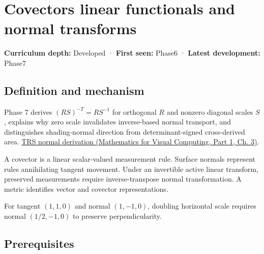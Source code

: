 \hypertarget{appendix-46da295c6787}{}\label{referencestart:appendix-46da295c6787}
\section{Covectors linear functionals and normal transforms}\label{appendix-46da295c6787-covectors-linear-functionals-and-normal-transforms}

\hypertarget{appendix-46da295c6787-covectors-linear-functionals-and-normal-transforms}{}

\textbf{Curriculum depth:} Developed · \textbf{First seen:} Phase6 · \textbf{Latest development:} Phase7

\begin{allmightroledefinition}

\subsection{Definition and mechanism}\label{appendix-46da295c6787-definition-and-mechanism}

\hypertarget{appendix-46da295c6787-definition-and-mechanism}{}

Phase 7 derives \((RS)^{-T}=RS^{-1}\) for orthogonal \(R\) and nonzero diagonal scales \(S\), explains why zero scale invalidates inverse-based normal transport, and distinguishes shading-normal direction from determinant-signed cross-derived area. \href{../02-Mathematics-for-Visual-Computing-P01/main.pdf\#nameddest=01-foundations-i-ch019-normals-undo-scale-before-following-rotation}{TRS normal derivation (Mathematics for Visual Computing, Part 1, Ch. 3)}.

\end{allmightroledefinition}

A covector is a linear scalar-valued measurement rule. Surface normals represent rules annihilating tangent movement. Under an invertible active linear transform, preserved measurements require inverse-transpose normal transformation. A metric identifies vector and covector representations.

For tangent \((1,1,0)\) and normal \((1,-1,0)\), doubling horizontal scale requires normal \((1/2,-1,0)\) to preserve perpendicularity.

\subsection{Prerequisites}\label{appendix-46da295c6787-prerequisites}

